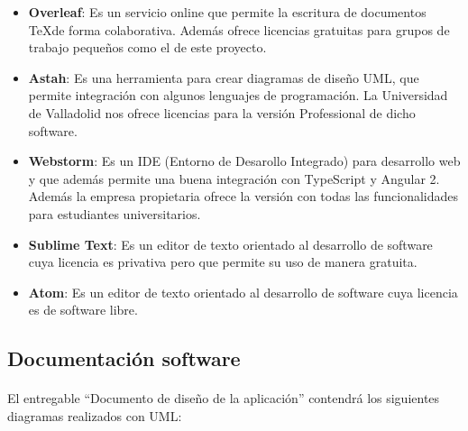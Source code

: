\documentclass{article}
\begin{document}
            \begin{itemize}
            	\item \textbf{Overleaf}: Es un servicio online que permite la escritura de documentos \TeX de forma colaborativa. Además ofrece licencias gratuitas para grupos de trabajo pequeños como el de este proyecto.

            	\item \textbf{Astah}: Es una herramienta para crear diagramas de diseño UML, que permite integración con algunos lenguajes de programación. La Universidad de Valladolid nos ofrece licencias para la versión Professional de dicho software.

            	\item \textbf{Webstorm}: Es un IDE (Entorno de Desarollo Integrado) para desarrollo web y que además permite una buena integración con TypeScript y Angular 2. Además la empresa propietaria ofrece la versión con todas las funcionalidades para estudiantes universitarios.

            	\item \textbf{Sublime Text}: Es un editor de texto orientado al desarrollo de software cuya licencia es privativa pero que permite su uso de manera gratuita.

            	\item \textbf{Atom}: Es un editor de texto orientado al desarrollo de software cuya licencia es de software libre.


            \end{itemize}
            
       	\subsection{Documentación software}

			\paragraph{}
            El entregable ``Documento de diseño de la aplicación'' contendrá los siguientes diagramas realizados con UML:
            
\end{document}
